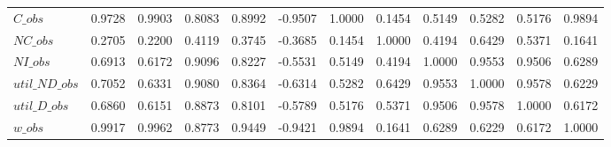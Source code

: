 \begin{center}
\begin{longtable}{lccccccccccc}
$C\_obs         $	 & 	           0.9728	 & 	           0.9903	 & 	           0.8083	 & 	           0.8992	 & 	          -0.9507	 & 	           1.0000	 & 	           0.1454	 & 	           0.5149	 & 	           0.5282	 & 	           0.5176	 & 	           0.9894 \\ 
$NC\_obs        $	 & 	           0.2705	 & 	           0.2200	 & 	           0.4119	 & 	           0.3745	 & 	          -0.3685	 & 	           0.1454	 & 	           1.0000	 & 	           0.4194	 & 	           0.6429	 & 	           0.5371	 & 	           0.1641 \\ 
$NI\_obs        $	 & 	           0.6913	 & 	           0.6172	 & 	           0.9096	 & 	           0.8227	 & 	          -0.5531	 & 	           0.5149	 & 	           0.4194	 & 	           1.0000	 & 	           0.9553	 & 	           0.9506	 & 	           0.6289 \\ 
$util\_ND\_obs  $	 & 	           0.7052	 & 	           0.6331	 & 	           0.9080	 & 	           0.8364	 & 	          -0.6314	 & 	           0.5282	 & 	           0.6429	 & 	           0.9553	 & 	           1.0000	 & 	           0.9578	 & 	           0.6229 \\ 
$util\_D\_obs   $	 & 	           0.6860	 & 	           0.6151	 & 	           0.8873	 & 	           0.8101	 & 	          -0.5789	 & 	           0.5176	 & 	           0.5371	 & 	           0.9506	 & 	           0.9578	 & 	           1.0000	 & 	           0.6172 \\ 
$w\_obs         $	 & 	           0.9917	 & 	           0.9962	 & 	           0.8773	 & 	           0.9449	 & 	          -0.9421	 & 	           0.9894	 & 	           0.1641	 & 	           0.6289	 & 	           0.6229	 & 	           0.6172	 & 	           1.0000 \\ 
\end{longtable}
 \end{center}
